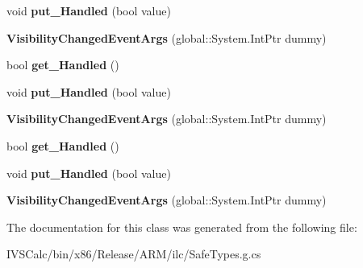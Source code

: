 \begin{DoxyCompactItemize}
\mbox{\label{class_windows_1_1_u_i_1_1_core_1_1_visibility_changed_event_args_aa3d934d7b901facdfa204fc5af9a49c2}} 
void {\bfseries put\+\_\+\+Handled} (bool value)
\item 
\mbox{\label{class_windows_1_1_u_i_1_1_core_1_1_visibility_changed_event_args_ab02568d4fa2ba877a196ee99ea9e28ea}} 
{\bfseries Visibility\+Changed\+Event\+Args} (global\+::\+System.\+Int\+Ptr dummy)
\item 
\mbox{\label{class_windows_1_1_u_i_1_1_core_1_1_visibility_changed_event_args_a3e8ad74a57739aa61826f401c9ea660f}} 
bool {\bfseries get\+\_\+\+Handled} ()
\item 
\mbox{\label{class_windows_1_1_u_i_1_1_core_1_1_visibility_changed_event_args_aa3d934d7b901facdfa204fc5af9a49c2}} 
void {\bfseries put\+\_\+\+Handled} (bool value)
\item 
\mbox{\label{class_windows_1_1_u_i_1_1_core_1_1_visibility_changed_event_args_ab02568d4fa2ba877a196ee99ea9e28ea}} 
{\bfseries Visibility\+Changed\+Event\+Args} (global\+::\+System.\+Int\+Ptr dummy)
\item 
\mbox{\label{class_windows_1_1_u_i_1_1_core_1_1_visibility_changed_event_args_a3e8ad74a57739aa61826f401c9ea660f}} 
bool {\bfseries get\+\_\+\+Handled} ()
\item 
\mbox{\label{class_windows_1_1_u_i_1_1_core_1_1_visibility_changed_event_args_aa3d934d7b901facdfa204fc5af9a49c2}} 
void {\bfseries put\+\_\+\+Handled} (bool value)
\item 
\mbox{\label{class_windows_1_1_u_i_1_1_core_1_1_visibility_changed_event_args_ab02568d4fa2ba877a196ee99ea9e28ea}} 
{\bfseries Visibility\+Changed\+Event\+Args} (global\+::\+System.\+Int\+Ptr dummy)
\end{DoxyCompactItemize}


The documentation for this class was generated from the following file\+:\begin{DoxyCompactItemize}
\item 
I\+V\+S\+Calc/bin/x86/\+Release/\+A\+R\+M/ilc/Safe\+Types.\+g.\+cs\end{DoxyCompactItemize}
